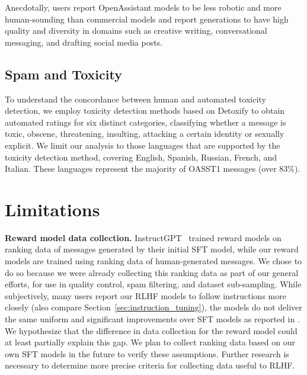 Anecdotally, users report OpenAssistant models to be less robotic and more human-sounding than commercial models and report generations to have high quality and diversity in domains such as creative writing, conversational messaging, and drafting social media posts.



\subsection{Spam and Toxicity}
\label{sec:spam_and_toxicity}

To understand the concordance between human and automated toxicity detection, we employ toxicity detection methods based on Detoxify \cite{Detoxify} to obtain automated ratings for six distinct categories, classifying whether a message is toxic, obscene, threatening, insulting, attacking a certain identity or sexually explicit. We limit our analysis to those languages that are supported by the toxicity detection method, covering English, Spanish, Russian, French, and Italian. These languages represent the majority of OASST1 messages (over 83\%).

\section{Limitations}
\label{sec:limitations}

\textbf{Reward model data collection.} InstructGPT~\cite{ouyang2022training} trained reward models on ranking data of messages generated by their initial SFT model, while our reward models are trained using ranking data of human-generated messages. We chose to do so because we were already collecting this ranking data as part of our general efforts, for use in quality control, spam filtering, and dataset sub-sampling. While subjectively, many users report our RLHF models to follow instructions more closely (also compare Section~\ref{sec:instruction_tuning}), the models do not deliver the same uniform and significant improvements over SFT models as reported in \cite{ouyang2022training}. We hypothesize that the difference in data collection for the reward model could at least partially explain this gap. We plan to collect ranking data based on our own SFT models in the future to verify these assumptions. Further research is necessary to determine more precise criteria for collecting data useful to RLHF.

